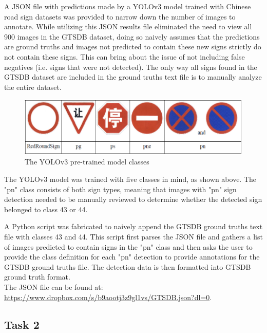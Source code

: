 \documentclass{article}
\begin{document}
            A JSON file with predictions made by a YOLOv3 model trained with Chinese road sign datasets was provided to narrow down the number of images to annotate. While utilizing this JSON results file eliminated the need to view all 900 images in the GTSDB dataset, doing so naively assumes that the predictions are ground truths and images not predicted to contain these new signs strictly do not contain these signs. This can bring about the issue of not including false negatives (i.e. signs that were not detected). The only way all signs found in the GTSDB dataset are included in the ground truths text file is to manually analyze the entire dataset. 
            
            \begin{figure}[h!]
                \centering
                \includegraphics[scale=0.5]{json_classes}
                \caption{The YOLOv3 pre-trained model classes}
            \end{figure}
        
            The YOLOv3 model was trained with five classes in mind, as shown above. The "pn" class consists of both sign types, meaning that images with "pn" sign detection needed to be manually reviewed to determine whether the detected sign belonged to class 43 or 44. 
            
            A Python script was fabricated to naively append the GTSDB ground truths text file with classes 43 and 44. This script first parses the JSON file and gathers a list of images predicted to contain signs in the "pn" class and then asks the user to provide the class definition for each "pn" detection to provide annotations for the GTSDB ground truths file. The detection data is then formatted into GTSDB ground truth format. \\
            
            The JSON file can be found at: \url{https://www.dropbox.com/s/b9aootj3z9gl1vs/GTSDB.json?dl=0}. \\
            
        \subsection{Task 2}
        
\end{document}
